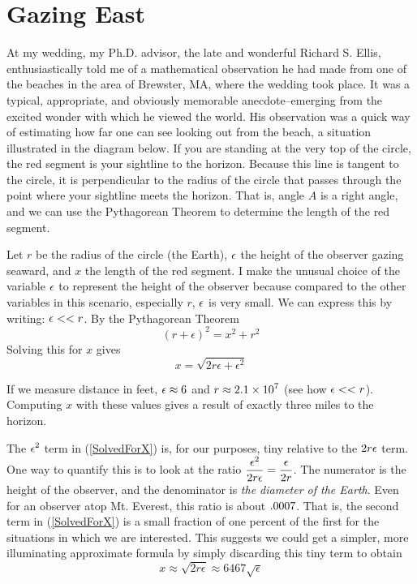 



\section*{Gazing East}

At my wedding, my Ph.D. advisor, the late and wonderful Richard S. Ellis, enthusiastically told me of a mathematical observation he had made from one of the beaches in the area of Brewster, MA, where the wedding took place. It was a typical, appropriate, and obviously memorable anecdote--emerging from the excited wonder with which he viewed the world. His observation was a quick way of estimating how far one can see looking out from the beach, a situation illustrated in the diagram below. If you are standing at the very top of the circle, the red segment is your sightline to the horizon. Because this line is tangent to the circle, it is perpendicular to the radius of the circle that passes through the point where your sightline meets the horizon. That is, angle $A$ is a right angle, and we can use the Pythagorean Theorem to determine the length of the red segment.


Let $r$ be the radius of the circle (the Earth), $\displaystyle \epsilon$ the height of the observer gazing seaward, and $x$ the length of the red segment. I make the unusual choice of the variable $\displaystyle \epsilon$ to represent the height of the observer because compared to the other variables in this scenario, especially $r$, $\displaystyle \epsilon$ is very small. We can express this by writing: $\displaystyle \epsilon << r$. By the Pythagorean Theorem
\[
  (r+\epsilon)^2 = x^2 + r^2
\]
Solving this for $x$ gives
\begin{equation} \label{SolvedForX}
  x = \sqrt{2 r \epsilon + \epsilon^2}
\end{equation}

If we measure distance in feet, $\displaystyle \epsilon \approx 6$ and $\displaystyle r \approx 2.1\times 10^7$ (see how $\displaystyle \epsilon<<r$). Computing $x$ with these values gives a result of exactly three miles to the horizon.

The $\displaystyle \epsilon^2$ term in (\ref{SolvedForX}) is, for our purposes, tiny relative to the $\displaystyle 2 r \epsilon$ term. One way to quantify this is to look at the ratio $\displaystyle \frac{\epsilon^2}{2 r \epsilon} = \frac{\epsilon}{2 r}$. The numerator is the height of the observer, and the denominator is \textit{the diameter of the Earth}. Even for an observer atop Mt. Everest, this ratio is about $\displaystyle .0007$. That is, the second term in (\ref{SolvedForX}) is a small fraction of one percent of the first for the situations in which we are interested. This suggests we could get a simpler, more illuminating approximate formula by simply discarding this tiny term to obtain
\[
 x \approx \sqrt{2 r \epsilon} \approx 6467 \sqrt{\epsilon}
\]



